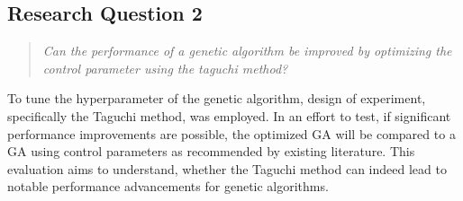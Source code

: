 \subsection{Research Question 2}
\begin{quote}
	\begin{em}
		\textit{Can the performance of a genetic algorithm be improved by optimizing the control parameter using the taguchi method?}
	\end{em}
\end{quote}

To tune the hyperparameter of the genetic algorithm, design of experiment, specifically the Taguchi method, was employed. In an effort to test, if significant performance improvements are possible, the optimized GA will be compared to a GA using control parameters as recommended by existing literature. This evaluation aims to understand, whether  the Taguchi method can indeed lead to notable performance advancements for genetic algorithms.























